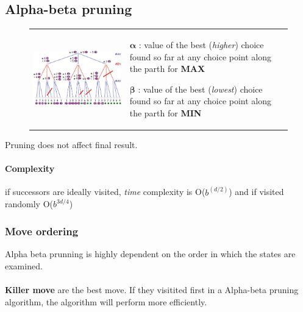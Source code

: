 \subsection{Alpha-beta pruning}
\begin{figure}[h]
\begin{tabular}{m{10cm}m{6cm}}
    \centering
    \includegraphics[width=10cm]{minmax_ex.png}
&

\begin{description}
    \item $\mathbf{\alpha}$ : value of the best (\textit{higher}) choice found
        so far at any choice point along the parth for \textbf{MAX}
    \item $\mathbf{\beta}$ : value of the best (\textit{lowest}) choice found
    so far at any choice point along the parth for \textbf{MIN}
\end{description}
\end{tabular}
\end{figure}

Pruning does not affect final result.

\paragraph{Complexity} if successors are ideally visited, \textit{time} complexity
is O($b^{(d/2)}$) and if visited randomly O($b^{3d/4}$)


\subsubsection{Move ordering}

Alpha beta prunning is highly dependent on the order in which the states are examined.

\paragraph{ }\textbf{Killer move} are the best move. If they visitited first in a Alpha-beta pruning algorithm,
the algorithm will perform more efficiently.



